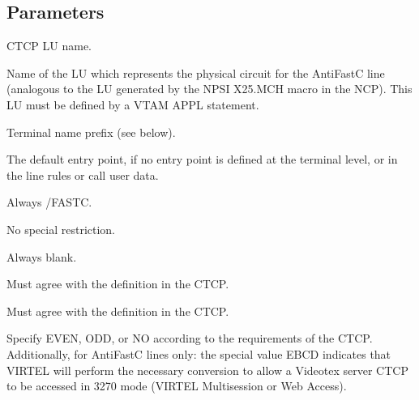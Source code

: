 \documentclass[letterpaper,10pt,english]{sphinxmanual}
\begin{document}
\sphinxAtStartPar
{}

\ignorespaces 

\subsection{Parameters}
\label{\detokenize{connectivity_guide:index-79}}\label{\detokenize{connectivity_guide:id37}}\begin{description}
\sphinxAtStartPar
CTCP LU name.

\sphinxAtStartPar
Name of the LU which represents the physical circuit for the AntiFastC line (analogous to the LU generated by the NPSI X25.MCH macro in the NCP). This LU must be defined by a VTAM APPL statement.

\sphinxAtStartPar
Terminal name prefix (see below).

\sphinxAtStartPar
The default entry point, if no entry point is defined at the terminal level, or in the line rules or call user data.

\sphinxAtStartPar
Always /FASTC.

\sphinxAtStartPar
No special restriction.

\sphinxAtStartPar
Always blank.

\sphinxAtStartPar
Must agree with the definition in the CTCP.

\sphinxAtStartPar
Must agree with the definition in the CTCP.

\sphinxAtStartPar
Specify EVEN, ODD, or NO according to the requirements of the CTCP. Additionally, for AntiFastC lines only: the special value EBCD indicates that VIRTEL will perform the necessary conversion to allow a Videotex server CTCP to be accessed in 3270 mode (VIRTEL Multisession or Web Access).

\end{description}

\ignorespaces 
\end{document}
